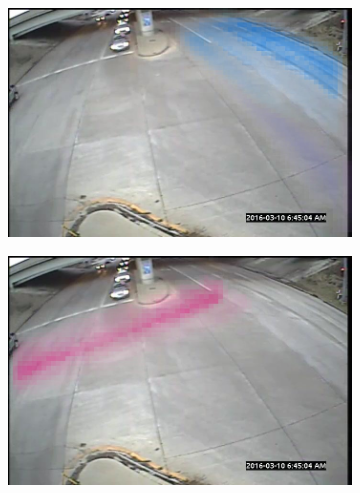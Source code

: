 \begin{figure}
    \begin{subfigure}{0.32\linewidth}
        \includegraphics[width=\linewidth]{./img/scene_learning/topics/topic-2.jpg}
    \end{subfigure}%
    \begin{subfigure}{0.32\linewidth}
        \includegraphics[width=\linewidth]{./img/scene_learning/topics/topic-4.jpg}
    \end{subfigure}%
    \hspace{0.08\linewidth}
    \begin{subfigure}{0.16\linewidth}

\end{subfigure}
\end{figure}
